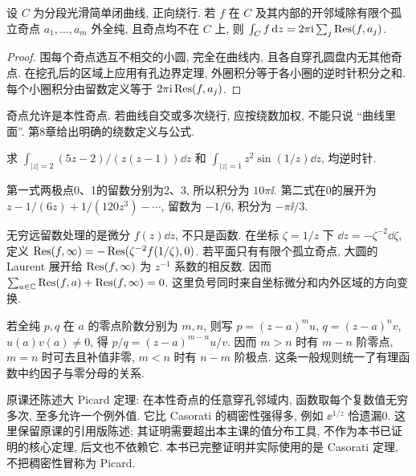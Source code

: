 \begin{theorem}\label{thm:residue}
设 $C$ 为分段光滑简单闭曲线, 正向绕行. 若 $f$ 在 $C$ 及其内部的开邻域除有限个孤立奇点 $a_1,\ldots,a_m$ 外全纯, 且奇点均不在 $C$ 上, 则 $\int_Cf\,\mathrm d z=2\pi\mathrm i\sum_j\operatorname{Res}(f,a_j)$.
\end{theorem}
\begin{proof}
围每个奇点选互不相交的小圆, 完全在曲线内, 且各自穿孔圆盘内无其他奇点. 在挖孔后的区域上应用有孔边界定理, 外圈积分等于各小圈的逆时针积分之和. 每个小圈积分由留数定义等于 $2\pi\mathrm i\operatorname{Res}(f,a_j)$.
\end{proof}
奇点允许是本性奇点. 若曲线自交或多次绕行, 应按绕数加权, 不能只说 ``曲线里面''. 第8章给出明确的绕数定义与公式.

\begin{example}
求 $\int_{|z|=2}(5z-2)/(z(z-1))\dd z$ 和 $\int_{|z|=1}z^2\sin(1/z)\dd z$, 均逆时针.
\end{example}
\begin{solution}
第一式两极点0、1的留数分别为2、3, 所以积分为 $10\pi\ii$. 第二式在0的展开为 $z-1/(6z)+1/(120z^3)-\cdots$, 留数为 $-1/6$, 积分为 $-\pi\ii/3$.
\end{solution}
无穷远留数处理的是微分 $f(z)\dd z$, 不只是函数. 在坐标 $\zeta=1/z$ 下 $\dd z=-\zeta^{-2}\dd\zeta$, 定义 $\operatorname{Res}(f,\infty)=-\operatorname{Res}(\zeta^{-2}f(1/\zeta),0)$. 若平面只有有限个孤立奇点, 大圆的 Laurent 展开给 $\operatorname{Res}(f,\infty)$ 为 $z^{-1}$ 系数的相反数. 因而 $\sum_{a\in\mathbb C}\operatorname{Res}(f,a)+\operatorname{Res}(f,\infty)=0$. 这里负号同时来自坐标微分和内外区域的方向变换.

若全纯 $p,q$ 在 $a$ 的零点阶数分别为 $m,n$, 则写 $p=(z-a)^mu$, $q=(z-a)^nv$, $u(a)v(a)\ne0$, 得 $p/q=(z-a)^{m-n}u/v$. 因而 $m>n$ 时有 $m-n$ 阶零点, $m=n$ 时可去且补值非零, $m<n$ 时有 $n-m$ 阶极点. 这条一般规则统一了有理函数中约因子与零分母的关系.

原课还陈述大 Picard 定理: 在本性奇点的任意穿孔邻域内, 函数取每个复数值无穷多次, 至多允许一个例外值. 它比 Casorati 的稠密性强得多, 例如 $\ee^{1/z}$ 恰遗漏0. 这里保留原课的引用版陈述; 其证明需要超出本主课的值分布工具, 不作为本书已证明的核心定理, 后文也不依赖它. 本书已完整证明并实际使用的是 Casorati 定理, 不把稠密性冒称为 Picard.


